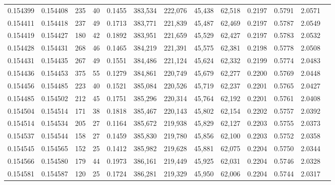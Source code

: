 \begin{tabular}{rrrrrrrrrrrrr}
0.154399 & 0.154408 &   235 &  40 &                                     0.1455 & 383,534 & 222,076 &  45,438 &  62,518 & 0.2197 & 0.5791 & 2.0571 \\
0.154411 & 0.154418 &   237 &  49 &                                     0.1713 & 383,771 & 221,839 &  45,487 &  62,469 & 0.2197 & 0.5787 & 2.0549 \\
0.154419 & 0.154427 &   180 &  42 &                                     0.1892 & 383,951 & 221,659 &  45,529 &  62,427 & 0.2197 & 0.5783 & 2.0532 \\
0.154428 & 0.154431 &   268 &  46 &                                     0.1465 & 384,219 & 221,391 &  45,575 &  62,381 & 0.2198 & 0.5778 & 2.0508 \\
0.154431 & 0.154435 &   267 &  49 &                                     0.1551 & 384,486 & 221,124 &  45,624 &  62,332 & 0.2199 & 0.5774 & 2.0483 \\
0.154436 & 0.154453 &   375 &  55 &                                     0.1279 & 384,861 & 220,749 &  45,679 &  62,277 & 0.2200 & 0.5769 & 2.0448 \\
0.154456 & 0.154485 &   223 &  40 &                                     0.1521 & 385,084 & 220,526 &  45,719 &  62,237 & 0.2201 & 0.5765 & 2.0427 \\
0.154485 & 0.154502 &   212 &  45 &                                     0.1751 & 385,296 & 220,314 &  45,764 &  62,192 & 0.2201 & 0.5761 & 2.0408 \\
0.154504 & 0.154514 &   171 &  38 &                                     0.1818 & 385,467 & 220,143 &  45,802 &  62,154 & 0.2202 & 0.5757 & 2.0392 \\
0.154514 & 0.154534 &   205 &  27 &                                     0.1164 & 385,672 & 219,938 &  45,829 &  62,127 & 0.2203 & 0.5755 & 2.0373 \\
0.154537 & 0.154544 &   158 &  27 &                                     0.1459 & 385,830 & 219,780 &  45,856 &  62,100 & 0.2203 & 0.5752 & 2.0358 \\
0.154545 & 0.154565 &   152 &  25 &                                     0.1412 & 385,982 & 219,628 &  45,881 &  62,075 & 0.2204 & 0.5750 & 2.0344 \\
0.154566 & 0.154580 &   179 &  44 &                                     0.1973 & 386,161 & 219,449 &  45,925 &  62,031 & 0.2204 & 0.5746 & 2.0328 \\
0.154581 & 0.154587 &   120 &  25 &                                     0.1724 & 386,281 & 219,329 &  45,950 &  62,006 & 0.2204 & 0.5744 & 2.0317 \\

\end{tabular}
